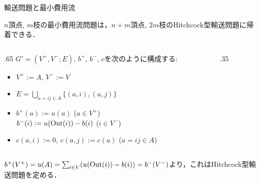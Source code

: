 \documentclass[14pt,aspectratio=169,xcolor=dvipsnames,table,onlytextwidth,dvipdfmx]{beamer}
\begin{document}
\begin{frame}{輸送問題と最小費用流}
    \small
    \begin{lemma}
        $n$頂点, $m$枝の最小費用流問題は，$n+m$頂点, $2m$枝のHitchcock型輸送問題に帰着できる．
    \end{lemma}

    \begin{columns}[T]
    \begin{column}{.65\textwidth}
    $G' = (V^+, V^-; E)$, $b^+$, $b^-$, $c$を次のように構成する:
    \begin{itemize}
        \setlength{\itemsep}{0em}
        \item $V^+ := A$, $V^- := V$
        \item $E = \bigcup_{a=ij \in A} \{ (a, i), (a, j)\}$
        \item $b^+(a) := u(a)$ \quad ($a \in V^+$) \\
              $b^-(i) := u(\operatorname{Out}(i)) - b(i)$ \quad ($i \in V^-$)
        \item $c(a, i) := 0$, $c(a, j) := c(a)$ \quad ($a=ij \in A$)
    \end{itemize}
    \end{column}
    \begin{column}{.35\textwidth}
        \centering
    \end{column}
    \end{columns}
    \bigskip
    $b^+(V^+) = u(A) = \sum_{i \in V} (u(\operatorname{Out}(i)) - b(i)) = b^-(V^-)$より，これはHitchcock型輸送問題を定める．
\end{frame}
\end{document}
